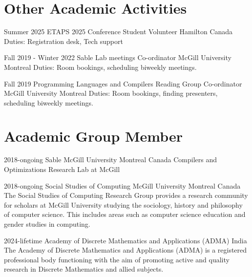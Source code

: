 
\section{Other Academic Activities}

    \cventry
        {Summer 2025}
        {ETAPS 2025 Conference}
        {Student Volunteer}
        {Hamilton}
        {Canada}
        {Duties: Registration desk, Tech support}

    \cventry
        {Fall 2019 - Winter 2022}
        {Sable Lab meetings}
        {Co-ordinator}
        {McGill University}
        {Montreal}
        {Duties: Room bookings, scheduling biweekly meetings.}

    \cventry
        {Fall 2019}
        {Programming Languages and Compilers Reading Group}
        {Co-ordinator}
        {McGill University}
        {Montreal}
        {Duties: Room bookings, finding presenters, scheduling biweekly meetings.}

\section{Academic Group Member}

    \cventry
        {2018-ongoing}
        {Sable}
        {McGill University}
        {Montreal}
        {Canada}
        {Compilers and Optimizations Research Lab at McGill}

    \cventry
        {2018-ongoing}
        {Social Studies of Computing}
        {McGill University}
        {Montreal}
        {Canada}
        {The Social Studies of Computing Research Group provides a research community for scholars at McGill University studying the sociology, history and philosophy of computer science. This includes areas such as computer science education and gender studies in computing.}

    \cventry
        {2024-lifetime}
        {Academy of Discrete Mathematics and Applications (ADMA)}
        {India}
        {}
        {}
        {The Academy of Discrete Mathematics and Applications (ADMA) is a registered professional body functioning with the aim of promoting active and quality research in Discrete Mathematics and allied subjects.}